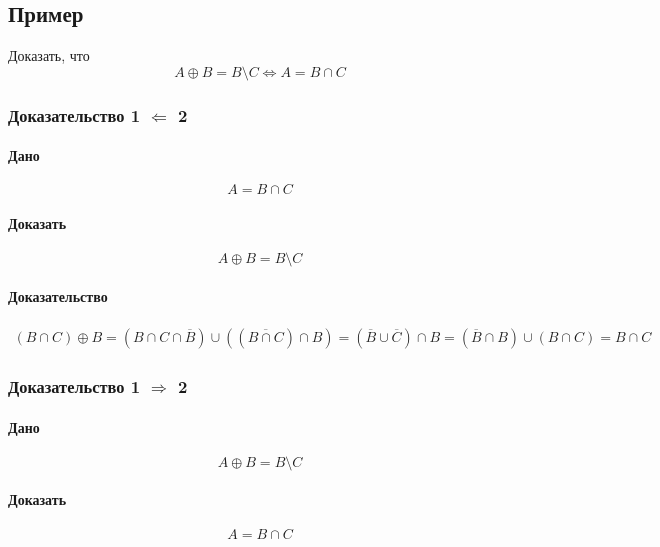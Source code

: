 \documentclass{article}
\begin{document}
\subsection{Пример}
Доказать, что
\[
    A \oplus B = B \setminus C \Leftrightarrow A = B \cap C
\]

\subsubsection{Доказательство 1 $\Leftarrow$ 2}
\paragraph{Дано}
\[
    A = B \cap C
\]

\paragraph{Доказать}
\[
    A \oplus B = B \setminus C
\]

\paragraph{Доказательство}
\begin{gather*}
    (B \cap C) \oplus B = (B \cap C \cap \overline{B}) \cup \left( (\overline{B \cap C}) \cap B \right) = 
    (\overline{B} \cup \overline{C}) \cap B = (\overline{B} \cap B) \cup (B \cap C) = B \cap C
\end{gather*}


\subsubsection{Доказательство 1 $\Rightarrow$ 2}
\paragraph{Дано}
\[
    A \oplus B = B \setminus C
\]

\paragraph{Доказать}
\[
    A = B \cap C
\]
\end{document}
